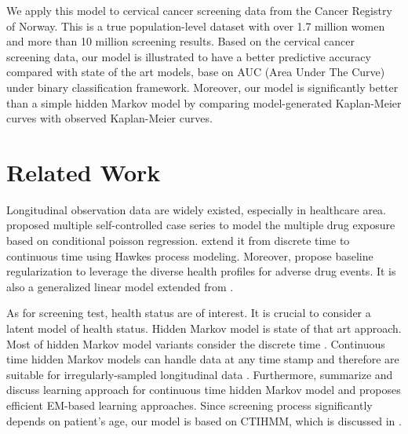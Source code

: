 \documentclass{article}
\begin{document}
We apply this model to cervical cancer screening data from the Cancer Registry of Norway. This is a true population-level dataset with over 1.7 million women and more than 10 million screening results. 
Based on the cervical cancer screening data, our model is illustrated to have a better predictive accuracy compared with state of the art models, base on AUC (Area Under The Curve) under binary classification framework. Moreover, our model is significantly better than a simple hidden Markov model by comparing model-generated Kaplan-Meier curves with observed Kaplan-Meier curves.


\section{Related Work}
Longitudinal observation data are widely existed, especially in healthcare area. \cite{Simpson_2013} proposed multiple self-controlled case series to model the multiple drug exposure based on conditional poisson regression. \cite{Bao_2017} extend it from discrete time to continuous time using Hawkes process modeling. Moreover, \cite{Kuang_2017} propose baseline regularization to leverage the diverse health profiles for adverse drug events. It is also a generalized linear model extended from \cite{Kuang_2016}.

As for screening test, health status are of interest. It is crucial to consider a latent model of health status. Hidden Markov model is state of that art approach. Most of hidden Markov model variants consider the discrete time \citep{Gael_2008,Beal02,Cem_2014}. Continuous time hidden Markov models can handle data at any time stamp \cite{Cox_1965} and therefore are suitable for irregularly-sampled longitudinal data \citep{Bartolonemo_2011,Liu_2013,Wang_2014}. Furthermore, \cite{Liu_2015} summarize and discuss learning approach for continuous time hidden Markov model and proposes efficient EM-based learning approaches. Since screening process significantly depends on patient's age, our model is based on CTIHMM, which is discussed in \cite{Sonnernberg_1993,Myers_2000,Canfell_2004}.
\end{document}
